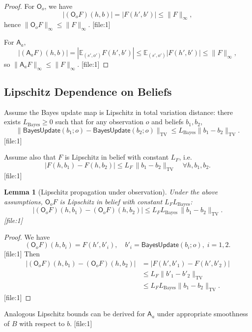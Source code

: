 \documentclass[11pt,a4paper]{article}
\theoremstyle{tealstyle}
\newtheorem{lemma}[theorem]{Lemma}
\theoremstyle{definition}
\begin{document}
\begin{proof}
For \(\mathsf{O}_o\), we have
\[
  |(\mathsf{O}_o F)(h,b)| = |F(h',b')| \le \|F\|_\infty,
\]
hence \(\|\mathsf{O}_o F\|_\infty \le \|F\|_\infty\). [file:1]

For \(\mathsf{A}_a\),
\[
  |(\mathsf{A}_a F)(h,b)|
  = \left|\mathbb{E}_{(s',o')} F(h', b') \right|
  \le \mathbb{E}_{(s',o')} |F(h',b')|
  \le \|F\|_\infty,
\]
so \(\|\mathsf{A}_a F\|_\infty \le \|F\|_\infty\). [file:1]
\end{proof}

\subsection{Lipschitz Dependence on Beliefs}

Assume the Bayes update map is Lipschitz in total variation distance: there exists \(L_{\text{Bayes}}\ge 0\) such that for any observation \(o\) and beliefs \(b_1,b_2\),
\[
  \|\mathsf{BayesUpdate}(b_1; o) - \mathsf{BayesUpdate}(b_2; o)\|_{\text{TV}} 
  \le L_{\text{Bayes}} \|b_1 - b_2\|_{\text{TV}}.
\] [file:1]

Assume also that \(F\) is Lipschitz in belief with constant \(L_F\), i.e.
\[
  |F(h, b_1) - F(h, b_2)|
  \le L_F \, \|b_1 - b_2\|_{\text{TV}}
  \quad \forall h, b_1, b_2.
\] [file:1]

\begin{lemma}[Lipschitz propagation under observation]
Under the above assumptions, \(\mathsf{O}_o F\) is Lipschitz in belief with constant \(L_F L_{\text{Bayes}}\):
\[
  |(\mathsf{O}_o F)(h, b_1) - (\mathsf{O}_o F)(h, b_2)|
  \le L_F L_{\text{Bayes}} \, \|b_1 - b_2\|_{\text{TV}}.
\] [file:1]
\end{lemma}

\begin{proof}
We have
\[
  (\mathsf{O}_o F)(h, b_i) = F(h', b'_i), \quad b'_i = \mathsf{BayesUpdate}(b_i; o), \; i=1,2.
\] [file:1]
Then
\begin{align*}
  |(\mathsf{O}_o F)(h, b_1) - (\mathsf{O}_o F)(h, b_2)|
  &= |F(h', b'_1) - F(h', b'_2)| \\
  &\le L_F \|b'_1 - b'_2\|_{\text{TV}} \\
  &\le L_F L_{\text{Bayes}} \|b_1 - b_2\|_{\text{TV}}.
\end{align*} [file:1]
\end{proof}

Analogous Lipschitz bounds can be derived for \(\mathsf{A}_a\) under appropriate smoothness of \(B\) with respect to \(b\). [file:1]
\end{document}

